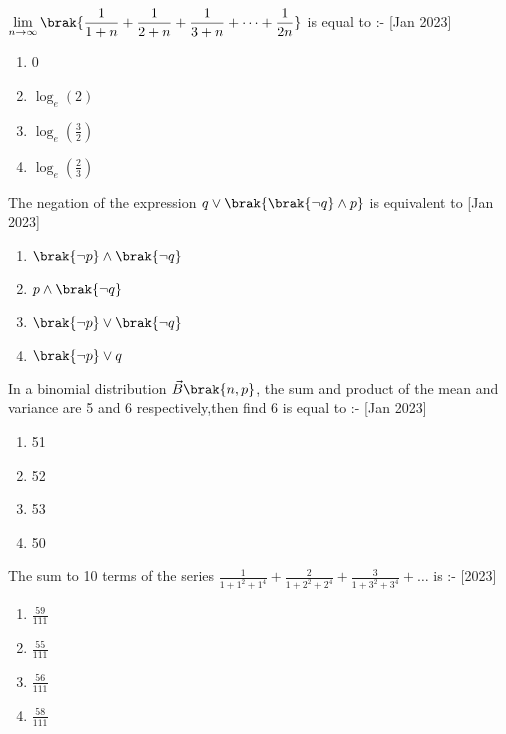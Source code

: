 \iffalse
\title{Jan 2023}
\author{EE24BTECH11027}
\section{mcq-single}
\fi
	\item $\displaystyle \lim_{n \to \infty} \brak{ \frac{1}{1+n} + \frac{1}{2+n} + \frac{1}{3+n} + \dots +\frac{1}{2n} }$ is equal to :-
\hfill{[Jan 2023]}
\begin{multicols}{2}
\begin{enumerate}
    \item 0
    \item $\log_e(2)$
    \item $\log_e(\frac{3}{2})$
    \item $\log_e(\frac{2}{3})$
\end{enumerate}
\end{multicols}
\item The negation of the expression $q \vee \brak{\brak{\neg q}\wedge p}$ is equivalent to 
\hfill{[Jan 2023]}
\begin{multicols}{2}
\begin{enumerate}
\item $\brak{\neg p} \wedge \brak{\neg q}$
\item $p \wedge \brak{\neg q}$
\item $\brak{\neg p} \vee \brak{\neg q}$
\item $\brak{\neg p} \vee q$
\end{enumerate}
\end{multicols}
\item In a binomial distribution $\Vec{B}\brak{n,p}$, the sum and product of the mean and variance are 5 and 6 respectively,then find 6 is equal to :-
	\hfill{[Jan 2023]}
\begin{multicols}{2}
\begin{enumerate}
    \item 51
    \item 52
    \item 53
    \item 50
\end{enumerate}
\end{multicols}
\item The sum to 10 terms of the series $\frac{1}{1+1^2+1^4}+\frac{2}{1+2^2+2^4}+\frac{3}{1+3^2+3^4}+ \dots$ is :-
	\hfill{[2023]}
\begin{multicols}{2}
\begin{enumerate}
    \item $\frac{59}{111}$
    \item $\frac{55}{111}$
    \item $\frac{56}{111}$
    \item $\frac{58}{111}$
\end{enumerate}
\end{multicols}
